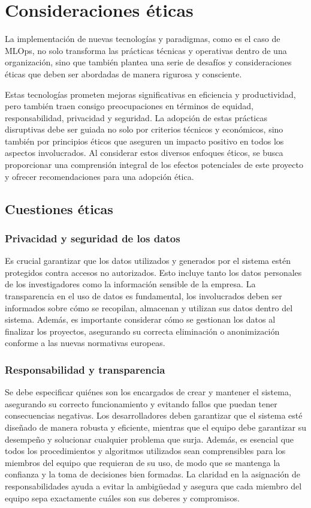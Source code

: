 \section{Consideraciones éticas}
La implementación de nuevas tecnologías y paradigmas, como 
es el caso de MLOps, no solo transforma las prácticas técnicas y 
operativas dentro de una organización, sino que también plantea una 
serie de desafíos y consideraciones éticas que deben ser abordadas 
de manera rigurosa y consciente.\medskip

Estas tecnologías prometen mejoras significativas en eficiencia 
y productividad, pero también traen consigo preocupaciones en 
términos de equidad, responsabilidad, privacidad y seguridad. La 
adopción de estas prácticas disruptivas debe ser guiada no solo 
por criterios técnicos y económicos, sino también por principios 
éticos que aseguren un impacto positivo en todos los aspectos 
involucrados. Al considerar estos diversos enfoques éticos, se 
busca proporcionar una comprensión integral de los efectos 
potenciales de este proyecto y ofrecer recomendaciones para 
una adopción ética.

\subsection{Cuestiones éticas}
\subsubsection{Privacidad y seguridad de los datos}
Es crucial garantizar que los datos utilizados y generados por el 
sistema estén protegidos contra accesos no autorizados. Esto incluye 
tanto los datos personales de los investigadores como la información sensible 
de la empresa. La transparencia en el uso de datos es fundamental, 
los involucrados deben ser informados sobre cómo se recopilan, almacenan 
y utilizan sus datos dentro del sistema. Además, es importante considerar 
cómo se gestionan los datos al finalizar los proyectos, asegurando su correcta 
eliminación o anonimización conforme a las nuevas normativas europeas.

\subsubsection{Responsabilidad y transparencia}
Se debe especificar quiénes son los encargados de crear y mantener el sistema, 
asegurando su correcto funcionamiento y evitando fallos que puedan tener 
consecuencias negativas. Los desarrolladores deben garantizar que el sistema esté 
diseñado de manera robusta y eficiente, mientras que el equipo debe garantizar su desempeño 
y solucionar cualquier problema que surja. Además, es esencial que todos los procedimientos 
y algoritmos utilizados sean comprensibles para los miembros del equipo que requieran de su uso, 
de modo que se mantenga la confianza y la toma de decisiones bien formadas. La claridad en la 
asignación de responsabilidades ayuda a evitar la ambigüedad y asegura que cada miembro del 
equipo sepa exactamente cuáles son sus deberes y compromisos.

